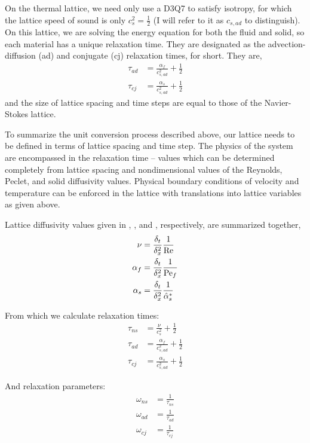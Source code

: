 On the thermal lattice, we need only use a D3Q7 to satisfy isotropy, for which the lattice speed of sound is only $c_s^2 = \frac{1}{2}$ (I will refer to it as $c_{s,ad}$ to distinguish). On this lattice, we are solving the energy equation for both the fluid and solid, so each material has a unique relaxation time. They are designated as the advection-diffusion (ad) and conjugate (cj) relaxation times, for short. They are,
\begin{subequations}
\begin{align}
	\tau_{ad} &= \frac{\alpha_f}{c_{s,ad}^2} + \frac{1}{2} \\
	\tau_{cj} &= \frac{\alpha_s}{c_{s,ad}^2} + \frac{1}{2}
\end{align}
\end{subequations}
and the size of lattice spacing and time steps are equal to those of the Navier-Stokes lattice.

To summarize the unit conversion process described above, our lattice needs to be defined in terms of lattice spacing and time step. The physics of the system are encompassed in the relaxation time -- values which can be determined completely from lattice spacing and nondimensional values of the Reynolds, Peclet, and solid diffusivity values. Physical boundary conditions of velocity and temperature can be enforced in the lattice with translations into lattice variables as given above. 

Lattice diffusivity values given in , , and , respectively, are summarized together,
\begin{align*}
	\nu &= \frac{\delta_t}{\delta_x^2}\frac{1}{\mathrm{Re}} \\
	\alpha_f &= \frac{\delta_t}{\delta_x^2}\frac{1}{\mathrm{Pe}_f} \\
	\alpha_s &= \frac{\delta_t}{\delta_x^2}\frac{1}{\hat\alpha_s^*}
\end{align*}

From which we calculate relaxation times:
\begin{align*}
	\tau_{ns} &= \frac{\nu}{c_s^2} + \frac{1}{2} \\
	\tau_{ad} &= \frac{\alpha_f}{c_{s,ad}^2} + \frac{1}{2} \\
	\tau_{cj} &= \frac{\alpha_s}{c_{s,ad}^2} + \frac{1}{2}
\end{align*}

And relaxation parameters:
\begin{align*}
	\omega_{ns} &= \frac{1}{\tau_{ns}} \\
	\omega_{ad} &= \frac{1}{\tau_{ad}} \\
	\omega_{cj} &= \frac{1}{\tau_{cj}}
\end{align*}

